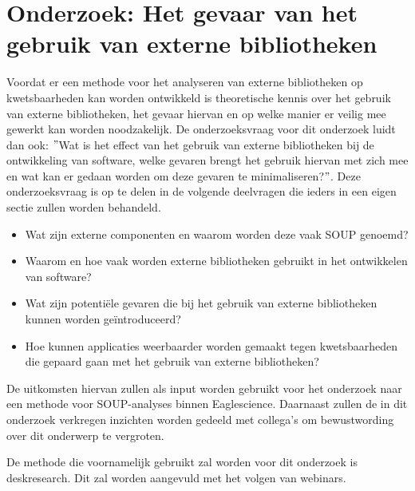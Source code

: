 
\chapter{Onderzoek: Het gevaar van het gebruik van externe bibliotheken}\label{ch:externeBibliothekengebruikGevaren}
Voordat er een methode voor het analyseren van externe bibliotheken op kwetsbaarheden kan worden ontwikkeld is theoretische kennis over het gebruik van externe bibliotheken, het gevaar hiervan en op welke manier er veilig mee gewerkt kan worden noodzakelijk. De onderzoeksvraag voor dit onderzoek luidt dan ook: $"$Wat is het effect van het gebruik van externe bibliotheken bij de ontwikkeling van software, welke gevaren brengt het gebruik hiervan met zich mee en wat kan er gedaan worden om deze gevaren te minimaliseren?$"$. Deze onderzoeksvraag is op te delen in de volgende deelvragen die ieders in een eigen sectie zullen worden behandeld.

\begin{itemize}
    \item Wat zijn externe componenten en waarom worden deze vaak SOUP genoemd?
    \item Waarom en hoe vaak worden externe bibliotheken gebruikt in het ontwikkelen van software?
    \item Wat zijn potentiële gevaren die bij het gebruik van externe bibliotheken kunnen worden geïntroduceerd?
    \item Hoe kunnen applicaties weerbaarder worden gemaakt tegen kwetsbaarheden die gepaard gaan met het gebruik van externe bibliotheken?
\end{itemize}
De uitkomsten hiervan zullen als input worden gebruikt voor het onderzoek naar een methode voor SOUP-analyses binnen Eaglescience. Daarnaast zullen de in dit onderzoek verkregen inzichten worden gedeeld met collega's om bewustwording over dit onderwerp te vergroten.

De methode die voornamelijk gebruikt zal worden voor dit onderzoek is deskresearch. Dit zal worden aangevuld met het volgen van webinars.

